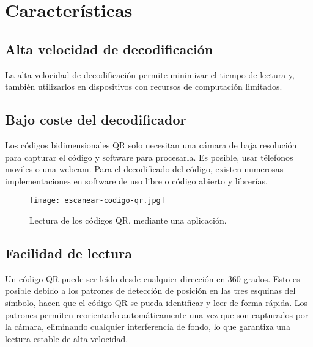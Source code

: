 \section{Características}

\subsection{Alta velocidad de decodificación}
La alta velocidad de decodificación permite minimizar el tiempo de lectura y, también utilizarlos en dispositivos con recursos de computación limitados.\cite{2012_Encinas}

\subsection{Bajo coste del decodificador}
Los códigos bidimensionales QR solo necesitan una cámara de baja resolución para capturar el código y software para procesarla. Es posible, usar télefonos moviles o una webcam. Para el decodificado del código, existen numerosas implementaciones en software de uso libre o código abierto y librerías.\cite{2012_Encinas}

\begin{figure} 
\centering
\texttt{[image: escanear-codigo-qr.jpg]}
\caption{Lectura de los códigos QR, mediante una aplicación.}
\label{fig:costedecodificador}
\end{figure} 

\subsection{Facilidad de lectura}
Un código QR puede ser leído desde cualquier dirección en 360 grados. Esto es posible debido a los patrones de detección de posición en las tres esquinas del símbolo, hacen que el código QR se pueda identificar y leer de forma rápida.\cite{2014_Chang}
Los patrones permiten reorientarlo automáticamente una vez que son capturados por la cámara, eliminando cualquier interferencia de fondo, lo que garantiza una lectura estable de alta velocidad.\cite{2012_Encinas,2012_DENSO}


